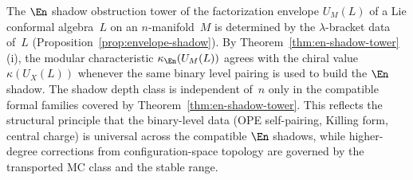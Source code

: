 \begin{remark}
\label{rem:en-shadow-envelope}
The $\En$ shadow obstruction tower of the factorization envelope
$U_M(L)$ of a Lie conformal algebra~$L$ on an $n$-manifold~$M$
is determined by the $\lambda$-bracket data of~$L$
(Proposition~\ref{prop:envelope-shadow}).
By Theorem~\ref{thm:en-shadow-tower}(i), the modular
characteristic $\kappa_{\En}(U_M(L))$ agrees with the chiral
value $\kappa(U_X(L))$ whenever the same binary level pairing is used
to build the $\En$ shadow. The shadow depth class is independent
of~$n$ only in the compatible formal families covered by
Theorem~\ref{thm:en-shadow-tower}.
This reflects the structural principle that the binary-level
data (OPE self-pairing, Killing form, central charge)
is universal across the compatible $\En$ shadows, while
higher-degree corrections from configuration-space topology are
governed by the transported MC class and the stable range.
\end{remark}

